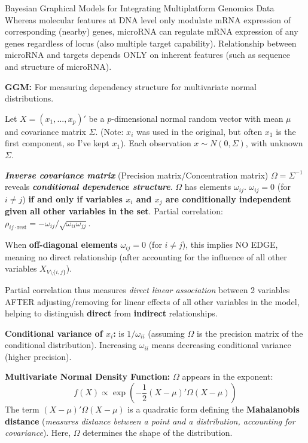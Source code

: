 \documentclass[twocolumn]{article}
\begin{document}
\begin{literaturepaper}{Bayesian Graphical Models for Integrating Multiplatform Genomics Data \cite{Wang_Baladandayuthapani_Holmes_Do_2013}}
    Whereas molecular features at DNA level only modulate mRNA expression of corresponding (nearby) genes, microRNA can regulate mRNA expression of any genes regardless of locus (also multiple target capability). Relationship between microRNA and targets depends ONLY on inherent features (such as sequence and structure of microRNA).

    \textbf{GGM:} For measuring dependency structure for multivariate normal distributions.

    Let $X = (x_1,...,x_p)'$ be a $p$-dimensional normal random vector with mean $\mu$ and covariance matrix $\Sigma$. (Note: $x_i$ was used in the original, but often $x_1$ is the first component, so I've kept $x_1$).
    Each observation $x \sim N(0, \Sigma)$, with unknown $\Sigma$.
    
    \textbf{\textit{Inverse covariance matrix}} (Precision matrix/Concentration matrix) $\Omega = \Sigma^{-1}$ reveals \textbf{\textit{conditional dependence structure}}. $\Omega$ has elements $\omega_{ij}$.
    $\omega_{ij} = 0$ (for $i \neq j$) \textbf{if and only if variables $x_i$ and $x_j$ are conditionally independent given all other variables in the set}.
    Partial correlation: $\rho_{ij \cdot \text{rest}} = -\omega_{ij} / \sqrt{\omega_{ii}\omega_{jj}}$.

    When \textbf{off-diagonal elements} $\omega_{ij} = 0$ (for $i \neq j$), this implies NO EDGE, meaning no direct relationship (after accounting for the influence of all other variables $X_{V \setminus \{i,j\}}$).

    Partial correlation thus measures \textit{direct linear association} between 2 variables AFTER adjusting/removing for linear effects of all other variables in the model, helping to distinguish \textbf{direct} from \textbf{indirect} relationships.

    \textbf{Conditional variance of $x_i$:} is $1/\omega_{ii}$ (assuming $\Omega$ is the precision matrix of the conditional distribution). Increasing $\omega_{ii}$ means decreasing conditional variance (higher precision).

    \textbf{Multivariate Normal Density Function:} $\Omega$ appears in the exponent:
    \[f(X) \propto \exp\left(-\frac{1}{2}(X-\mu)'\Omega(X-\mu)\right)\]
    The term $(X-\mu)'\Omega(X-\mu)$ is a quadratic form defining the \textbf{Mahalanobis distance} (\textit{measures distance between a point and a distribution, accounting for covariance}). Here, $\Omega$ determines the shape of the distribution.


\end{literaturepaper}
\end{document}
